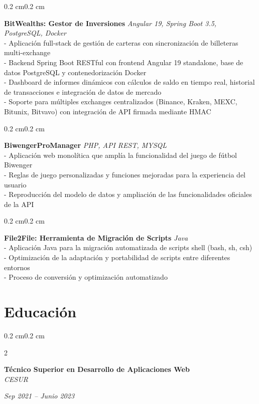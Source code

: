 \documentclass[10pt, letterpaper]{article}
\newenvironment{onecolentry}{
    \begin{adjustwidth}{0.2 cm}{0.2 cm}
}{
    \end{adjustwidth}
}
\newenvironment{twocolentry}[2][]{
    \onecolentry
    \def\secondColumn{#2}
    \setcolumnwidth{\fill, 4.5 cm}
    \begin{paracol}{2}
}{
    \switchcolumn \raggedleft \secondColumn
    \end{paracol}
    \endonecolentry
}
\begin{document}
    \begin{onecolentry}
        \textbf{BitWealths: Gestor de Inversiones} \hfill \textit{Angular 19, Spring Boot 3.5, PostgreSQL, Docker} \\
        - Aplicación full-stack de gestión de carteras con sincronización de billeteras multi-exchange \\
        - Backend Spring Boot RESTful con frontend Angular 19 standalone, base de datos PostgreSQL y contenedorización Docker \\
        - Dashboard de informes dinámicos con cálculos de saldo en tiempo real, historial de transacciones e integración de datos de mercado \\
        - Soporte para múltiples exchanges centralizados (Binance, Kraken, MEXC, Bitunix, Bitvavo) con integración de API firmada mediante HMAC
    \end{onecolentry}
    
    \vspace{0.1 cm}
    
    \begin{onecolentry}
        \textbf{BiwengerProManager} \hfill \textit{PHP, API REST, MYSQL} \\
        - Aplicación web monolítica que amplía la funcionalidad del juego de fútbol Biwenger \\
        - Reglas de juego personalizadas y funciones mejoradas para la experiencia del usuario \\
        - Reproducción del modelo de datos y ampliación de las funcionalidades oficiales de la API
    \end{onecolentry}

    \vspace{0.1 cm}
    
    \begin{onecolentry}
        \textbf{File2File: Herramienta de Migración de Scripts} \hfill \textit{Java} \\
        - Aplicación Java para la migración automatizada de scripts shell (bash, sh, csh) \\
        - Optimización de la adaptación y portabilidad de scripts entre diferentes entornos \\
        - Proceso de conversión y optimización automatizado
    \end{onecolentry}

    \section{Educación}
    \begin{twocolentry}{\textit{Sep 2021 -- Junio 2023}}
        \textbf{Técnico Superior en Desarrollo de Aplicaciones Web} \\
        \textit{CESUR}
    \end{twocolentry}
    
\end{document}
